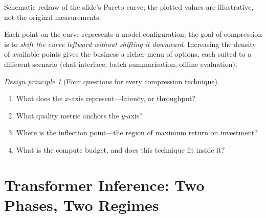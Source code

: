 \documentclass[11pt,a4paper]{article}
\theoremstyle{definition}
\theoremstyle{remark}
\newtheorem*{principle}{Design principle}
\theoremstyle{plain}
\begin{document}
\begin{center}
\par\smallskip
{\small Schematic redraw of the slide's Pareto curve; the plotted values
are illustrative, not the original measurements.}
\end{center}

Each point on the curve represents a model configuration; the goal of
compression is to \emph{shift the curve leftward without shifting it
downward}. Increasing the density of available points gives the business a
richer menu of options, each suited to a different scenario (chat
interface, batch summarisation, offline evaluation).

\begin{principle}[Four questions for every compression technique]
\begin{enumerate}[leftmargin=1.8em, itemsep=2pt, label=\arabic*.]
  \item What does the $x$-axis represent---latency, or throughput?
  \item What quality metric anchors the $y$-axis?
  \item Where is the inflection point---the region of maximum return on
        investment?
  \item What is the compute budget, and does this technique fit inside it?
\end{enumerate}
\end{principle}

\section{Transformer Inference: Two Phases, Two Regimes}
\label{sec:two-phases}
\end{document}
